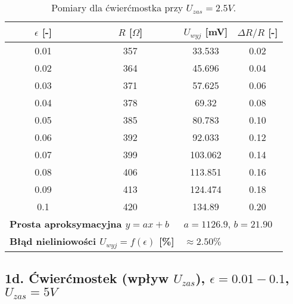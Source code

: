 \documentclass[12pt, a4paper]{article}
\begin{document}
	\begin{table}[H]
		\centering
		\caption{Pomiary dla ćwierćmostka przy $U_{zas} = 2.5 V$.}
		\begin{tabular}{cccc}
			\toprule
			$\epsilon$ [-] & $R$ [$\Omega$] & $U_{wyj}$ [mV] & $\Delta R/R$ [-] \\
			\midrule
			0.01 & 357 & 33.533 & 0.02 \\
			0.02 & 364 & 45.696 & 0.04 \\
			0.03 & 371 & 57.625 & 0.06 \\
			0.04 & 378 & 69.32 & 0.08 \\
			0.05 & 385 & 80.783 & 0.10 \\
			0.06 & 392 & 92.033 & 0.12 \\
			0.07 & 399 & 103.062 & 0.14 \\
			0.08 & 406 & 113.851 & 0.16 \\
			0.09 & 413 & 124.474 & 0.18 \\
			0.1 & 420 & 134.89 & 0.20 \\
			\midrule
			\multicolumn{2}{l}{\textbf{Prosta aproksymacyjna $y = ax + b$}} & \multicolumn{2}{l}{$a = 1126.9$, $b = 21.90$} \\
			\multicolumn{2}{l}{\textbf{Błąd nieliniowości $U_{wyj} = f(\epsilon)$ [\%]}} & \multicolumn{2}{l}{$\approx 2.50 \%$} \\
			\bottomrule
		\end{tabular}
	\end{table}
	
	\subsection{1d. Ćwierćmostek (wpływ $U_{zas}$), $\epsilon = 0.01-0.1$, $U_{zas} = 5 V$}
	
\end{document}
